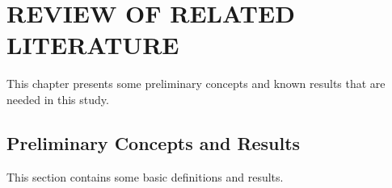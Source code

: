 \chapter{REVIEW OF RELATED LITERATURE}
{\baselineskip
This chapter presents some preliminary concepts and known results that are needed in this study.

\section{Preliminary Concepts and Results}
This section contains some basic definitions and results.

}